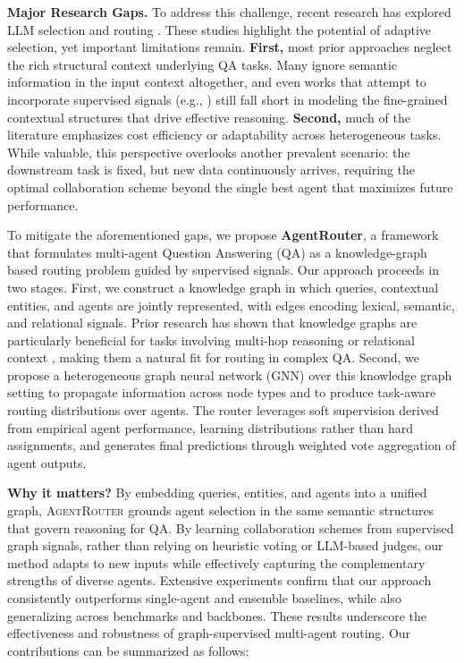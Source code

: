 \documentclass[11pt]{article}
\begin{document}
\noindent\textbf{Major Research Gaps.} To address this challenge, recent research has explored LLM selection and routing \citep{jiang2023llm, ong2024routellm, chen2024routerdc}. These studies highlight the potential of adaptive selection, yet important limitations remain. \textbf{First,} most prior approaches neglect the rich structural context underlying QA tasks. Many ignore semantic information in the input context altogether, and even works that attempt to incorporate supervised signals (e.g., \citep{feng2024graphrouter}) still fall short in modeling the fine-grained contextual structures that drive effective reasoning. \textbf{Second,} much of the literature emphasizes cost efficiency or adaptability across heterogeneous tasks. While valuable, this perspective overlooks another prevalent scenario: the downstream task is fixed, but new data continuously arrives, requiring the optimal collaboration scheme beyond the single best agent that maximizes future performance.  


To mitigate the aforementioned gaps, we propose \textbf{AgentRouter}, a framework that formulates multi-agent Question Answering (QA) as a knowledge-graph based routing problem guided by supervised signals. Our approach proceeds in two stages. First, we construct a knowledge graph in which queries, contextual entities, and agents are jointly represented, with edges encoding lexical, semantic, and relational signals. Prior research has shown that knowledge graphs are particularly beneficial for tasks involving multi-hop reasoning or relational context \citep{jin2024graph, jiang2024kg, peng2024graph}, making them a natural fit for routing in complex QA. Second, we propose a heterogeneous graph neural network (GNN) over this knowledge graph setting to propagate information across node types and to produce task-aware routing distributions over agents. The router leverages soft supervision derived from empirical agent performance, learning distributions rather than hard assignments, and generates final predictions through weighted vote aggregation of agent outputs.  

\noindent\textbf{Why it matters?} By embedding queries, entities, and agents into a unified graph, \textsc{AgentRouter} grounds agent selection in the same semantic structures that govern reasoning for QA. By learning collaboration schemes from supervised graph signals, rather than relying on heuristic voting or LLM-based judges, our method adapts to new inputs while effectively capturing the complementary strengths of diverse agents. Extensive experiments confirm that our approach consistently outperforms single-agent and ensemble baselines, while also generalizing across benchmarks and backbones. These results underscore the effectiveness and robustness of graph-supervised multi-agent routing. Our contributions can be summarized as follows:
\end{document}
